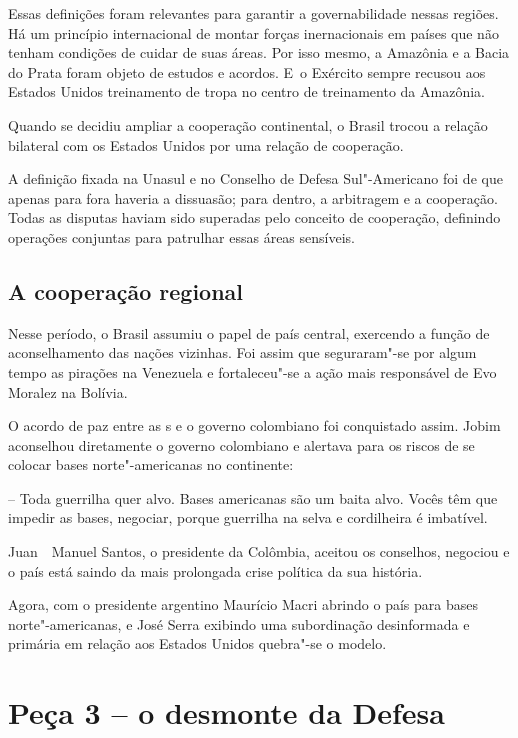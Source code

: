 Essas definições foram relevantes para garantir a governabilidade nessas
regiões. Há um princípio internacional de montar forças inernacionais em
países que não tenham condições de cuidar de suas áreas. Por isso mesmo,
a Amazônia e a Bacia do Prata foram objeto de estudos e acordos. E~o
Exército sempre recusou aos Estados Unidos treinamento de tropa no
centro de treinamento da Amazônia.

Quando se decidiu ampliar a cooperação continental, o Brasil trocou a
relação bilateral com os Estados Unidos por uma relação de cooperação.

A definição fixada na Unasul e no Conselho de Defesa Sul"-Americano foi
de que apenas para fora haveria a dissuasão; para dentro, a arbitragem e
a cooperação. Todas as disputas haviam sido superadas pelo conceito de
cooperação, definindo operações conjuntas para patrulhar essas áreas
sensíveis.

\subsection{A cooperação regional}

Nesse período, o Brasil assumiu o papel de país central, exercendo a
função de aconselhamento das nações vizinhas. Foi assim que seguraram"-se
por algum tempo as pirações na Venezuela e fortaleceu"-se a ação mais
responsável de Evo Moralez na Bolívia.

O acordo de paz entre as s e o governo colombiano foi conquistado
assim. Jobim aconselhou diretamente o governo colombiano e alertava para
os riscos de se colocar bases norte"-americanas no continente:

-- Toda guerrilha quer alvo. Bases americanas são um baita alvo. Vocês
têm que impedir as bases, negociar, porque guerrilha na selva e
cordilheira é imbatível.

Juan~~Manuel Santos, o presidente da Colômbia, aceitou os conselhos,
negociou e o país está saindo da mais prolongada crise política da sua
história.

Agora, com o presidente argentino Maurício Macri abrindo o país para
bases norte"-americanas, e José Serra exibindo uma subordinação
desinformada e primária em relação aos Estados Unidos quebra"-se o
modelo.

\section{Peça 3 -- o desmonte da Defesa}

